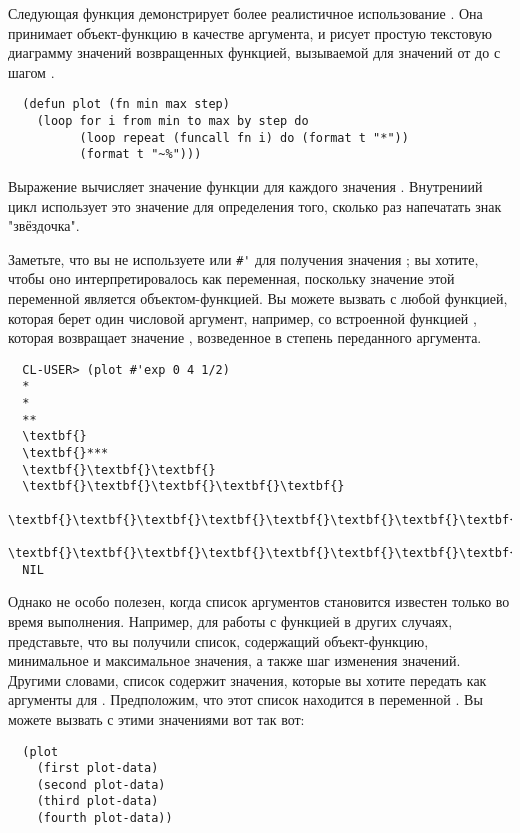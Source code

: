 Следующая функция демонстрирует более реалистичное использование .  Она
принимает объект-функцию в качестве аргумента, и рисует простую текстовую диаграмму
значений возвращенных функцией, вызываемой для значений от  до  с
шагом .

\begin{lstlisting}
  (defun plot (fn min max step)
    (loop for i from min to max by step do
          (loop repeat (funcall fn i) do (format t "*"))
          (format t "~%")))
\end{lstlisting}

Выражение  вычисляет значение функции для каждого значения .
Внутрениий цикл использует это значение для определения того, сколько раз напечатать знак
"звёздочка".

Заметьте, что вы не используете  или \lstinline!#'! для получения значения
; вы хотите, чтобы оно интерпретировалось как переменная, поскольку значение этой
переменной является объектом-функцией.  Вы можете вызвать  с любой функцией,
которая берет один числовой аргумент, например, со встроенной функцией , которая
возвращает значение , возведенное в степень переданного аргумента.

\begin{verbatim}
  CL-USER> (plot #'exp 0 4 1/2)
  *
  *
  **
  \textbf{}
  \textbf{}***
  \textbf{}\textbf{}\textbf{}
  \textbf{}\textbf{}\textbf{}\textbf{}\textbf{}
  \textbf{}\textbf{}\textbf{}\textbf{}\textbf{}\textbf{}\textbf{}\textbf{}*
  \textbf{}\textbf{}\textbf{}\textbf{}\textbf{}\textbf{}\textbf{}\textbf{}\textbf{}\textbf{}\textbf{}\textbf{}\textbf{}**
  NIL
\end{verbatim}

Однако  не особо полезен, когда список аргументов становится известен только
во время выполнения.  Например, для работы с функцией  в других случаях,
представьте, что вы получили список, содержащий объект-функцию, минимальное и максимальное
значения, а также шаг изменения значений.  Другими словами, список содержит значения,
которые вы хотите передать как аргументы для .  Предположим, что этот список
находится в переменной .  Вы можете вызвать  с этими значениями
вот так вот:

\begin{lstlisting}
  (plot 
    (first plot-data) 
    (second plot-data) 
    (third plot-data) 
    (fourth plot-data))
\end{lstlisting}

